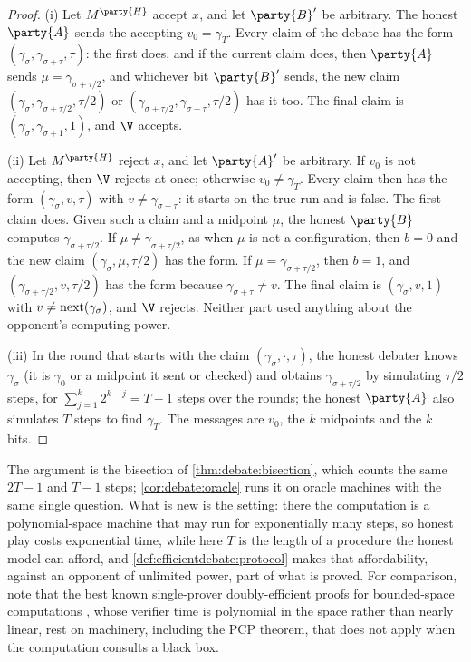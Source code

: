 \begin{refsection}
\begin{proof}
(i) Let $M^{\party{H}}$ accept $x$, and let $\party{B}'$ be arbitrary. The honest $\party{A}$ sends the accepting $v_0=\gamma_T$. Every claim of the debate has the form $(\gamma_\sigma,\gamma_{\sigma+\tau},\tau)$: the first does, and if the current claim does, then $\party{A}$ sends $\mu=\gamma_{\sigma+\tau/2}$, and whichever bit $\party{B}'$ sends, the new claim $(\gamma_\sigma,\gamma_{\sigma+\tau/2},\tau/2)$ or $(\gamma_{\sigma+\tau/2},\gamma_{\sigma+\tau},\tau/2)$ has it too. The final claim is $(\gamma_\sigma,\gamma_{\sigma+1},1)$, and $\V$ accepts.

(ii) Let $M^{\party{H}}$ reject $x$, and let $\party{A}'$ be arbitrary. If $v_0$ is not accepting, then $\V$ rejects at once; otherwise $v_0\ne\gamma_T$. Every claim then has the form $(\gamma_\sigma,v,\tau)$ with $v\ne\gamma_{\sigma+\tau}$: it starts on the true run and is false. The first claim does. Given such a claim and a midpoint $\mu$, the honest $\party{B}$ computes $\gamma_{\sigma+\tau/2}$. If $\mu\ne\gamma_{\sigma+\tau/2}$, as when $\mu$ is not a configuration, then $b=0$ and the new claim $(\gamma_\sigma,\mu,\tau/2)$ has the form. If $\mu=\gamma_{\sigma+\tau/2}$, then $b=1$, and $(\gamma_{\sigma+\tau/2},v,\tau/2)$ has the form because $\gamma_{\sigma+\tau}\ne v$. The final claim is $(\gamma_\sigma,v,1)$ with $v\ne\operatorname{next}(\gamma_\sigma)$, and $\V$ rejects. Neither part used anything about the opponent's computing power.

(iii) In the round that starts with the claim $(\gamma_\sigma,\cdot,\tau)$, the honest debater knows $\gamma_\sigma$ (it is $\gamma_0$ or a midpoint it sent or checked) and obtains $\gamma_{\sigma+\tau/2}$ by simulating $\tau/2$ steps, for $\sum_{j=1}^k2^{k-j}=T-1$ steps over the rounds; the honest $\party{A}$ also simulates $T$ steps to find $\gamma_T$. The messages are $v_0$, the $k$ midpoints and the $k$ bits.
\end{proof}

The argument is the bisection of \cref{thm:debate:bisection}, which counts the same $2T-1$ and $T-1$ steps; \cref{cor:debate:oracle} runs it on oracle machines with the same single question. What is new is the setting: there the computation is a polynomial-space machine that may run for exponentially many steps, so honest play costs exponential time, while here $T$ is the length of a procedure the honest model can afford, and \cref{def:efficientdebate:protocol} makes that affordability, against an opponent of unlimited power, part of what is proved. For comparison, \textcite{BrownCohenEtAl2024} note that the best known single-prover doubly-efficient proofs for bounded-space computations \parencite{ReingoldRothblumRothblum2021}, whose verifier time is polynomial in the space rather than nearly linear, rest on machinery, including the PCP theorem, that does not apply when the computation consults a black box.


\end{refsection}
